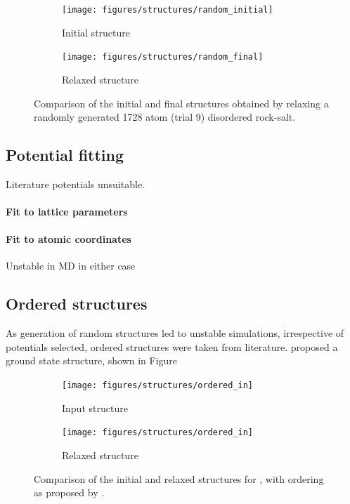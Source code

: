 \newpage
\begin{figure}[H]
\centering
 \begin{subfigure}{\textwidth}
 \centering
    \texttt{[image: figures/structures/random\_initial]}
    \caption{Initial structure}
    \label{fig:random_initial}
 \end{subfigure}
  \begin{subfigure}{\textwidth}
   \centering
    \texttt{[image: figures/structures/random\_final]}
    \caption{Relaxed structure}
    \label{fig:random_final}
 \end{subfigure}
\label{fig:random}
\caption{Comparison of the initial and final structures obtained by relaxing a randomly generated 1728 atom (trial 9)  disordered rock-salt.}
\end{figure}


\subsection{Potential fitting}
Literature potentials unsuitable.
\paragraph{Fit to lattice parameters}
\paragraph{Fit to atomic coordinates}
Unstable in MD in either case

\newpage
\subsection{Ordered structures}
As generation of random structures led to unstable simulations, irrespective of potentials selected, ordered structures were taken from literature.
\citet{Diaz-Lopez2017} proposed a ground state structure, shown in Figure 

\begin{figure}[p]
\centering

\begin{subfigure}{0.5\textwidth}
\centering
\texttt{[image: figures/structures/ordered\_in]}
\caption{Input structure\cite{Diaz-Lopez2017}}
\end{subfigure}%
\begin{subfigure}{0.5\textwidth}
\centering
\texttt{[image: figures/structures/ordered\_in]}
\caption{Relaxed structure}
\end{subfigure}

\caption[Comparison of the initial and relaxed structures for ordered ]{Comparison of the initial and relaxed structures for , with ordering as proposed by \citet{Diaz-Lopez2017}.}
\end{figure}

